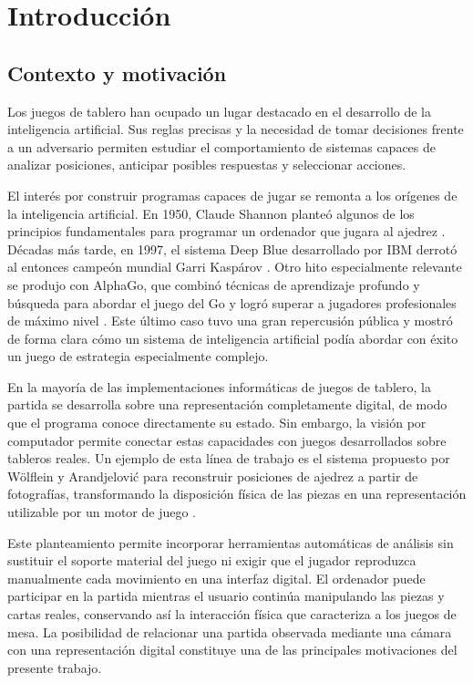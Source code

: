 \chapter{Introducción}
\label{chap:introduccion}

\section{Contexto y motivación}
\label{sec:contexto-motivacion}

Los juegos de tablero han ocupado un lugar destacado en el desarrollo de la inteligencia artificial. Sus reglas precisas y la necesidad de tomar decisiones frente a un adversario permiten estudiar el comportamiento de sistemas capaces de analizar posiciones, anticipar posibles respuestas y seleccionar acciones.

El interés por construir programas capaces de jugar se remonta a los orígenes de la inteligencia artificial. En 1950, Claude Shannon planteó algunos de los principios fundamentales para programar un ordenador que jugara al ajedrez \cite{shannon1950chess}. Décadas más tarde, en 1997, el sistema Deep Blue desarrollado por IBM derrotó al entonces campeón mundial Garri Kaspárov \cite{ibm_deep_blue}. Otro hito especialmente relevante se produjo con AlphaGo, que combinó técnicas de aprendizaje profundo y búsqueda para abordar el juego del Go y logró superar a jugadores profesionales de máximo nivel \cite{silver2016alphago}. Este último caso tuvo una gran repercusión pública y mostró de forma clara cómo un sistema de inteligencia artificial podía abordar con éxito un juego de estrategia especialmente complejo.

En la mayoría de las implementaciones informáticas de juegos de tablero, la partida se desarrolla sobre una representación completamente digital, de modo que el programa conoce directamente su estado. Sin embargo, la visión por computador permite conectar estas capacidades con juegos desarrollados sobre tableros reales. Un ejemplo de esta línea de trabajo es el sistema propuesto por Wölflein y Arandjelović para reconstruir posiciones de ajedrez a partir de fotografías, transformando la disposición física de las piezas en una representación utilizable por un motor de juego \cite{wolflein2021chessState}.

Este planteamiento permite incorporar herramientas automáticas de análisis sin sustituir el soporte material del juego ni exigir que el jugador reproduzca manualmente cada movimiento en una interfaz digital. El ordenador puede participar en la partida mientras el usuario continúa manipulando las piezas y cartas reales, conservando así la interacción física que caracteriza a los juegos de mesa. La posibilidad de relacionar una partida observada mediante una cámara con una representación digital constituye una de las principales motivaciones del presente trabajo.

